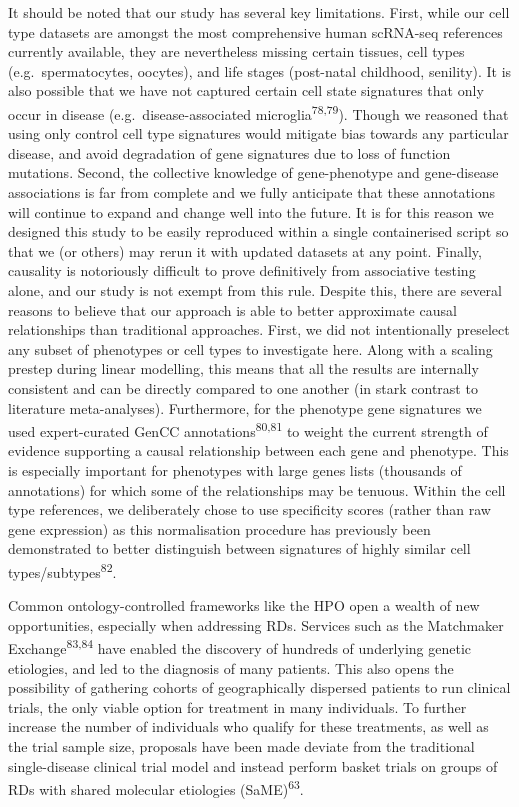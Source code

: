 \documentclass[
]{article}
\begin{document}
It should be noted that our study has several key limitations. First,
while our cell type datasets are amongst the most comprehensive human
scRNA-seq references currently available, they are nevertheless missing
certain tissues, cell types (e.g.~spermatocytes, oocytes), and life
stages (post-natal childhood, senility). It is also possible that we
have not captured certain cell state signatures that only occur in
disease (e.g.~disease-associated microglia\textsuperscript{78,79}).
Though we reasoned that using only control cell type signatures would
mitigate bias towards any particular disease, and avoid degradation of
gene signatures due to loss of function mutations. Second, the
collective knowledge of gene-phenotype and gene-disease associations is
far from complete and we fully anticipate that these annotations will
continue to expand and change well into the future. It is for this
reason we designed this study to be easily reproduced within a single
containerised script so that we (or others) may rerun it with updated
datasets at any point. Finally, causality is notoriously difficult to
prove definitively from associative testing alone, and our study is not
exempt from this rule. Despite this, there are several reasons to
believe that our approach is able to better approximate causal
relationships than traditional approaches. First, we did not
intentionally preselect any subset of phenotypes or cell types to
investigate here. Along with a scaling prestep during linear modelling,
this means that all the results are internally consistent and can be
directly compared to one another (in stark contrast to literature
meta-analyses). Furthermore, for the phenotype gene signatures we used
expert-curated GenCC annotations\textsuperscript{80,81} to weight the
current strength of evidence supporting a causal relationship between
each gene and phenotype. This is especially important for phenotypes
with large genes lists (thousands of annotations) for which some of the
relationships may be tenuous. Within the cell type references, we
deliberately chose to use specificity scores (rather than raw gene
expression) as this normalisation procedure has previously been
demonstrated to better distinguish between signatures of highly similar
cell types/subtypes\textsuperscript{82}.

Common ontology-controlled frameworks like the HPO open a wealth of new
opportunities, especially when addressing RDs. Services such as the
Matchmaker Exchange\textsuperscript{83,84} have enabled the discovery of
hundreds of underlying genetic etiologies, and led to the diagnosis of
many patients. This also opens the possibility of gathering cohorts of
geographically dispersed patients to run clinical trials, the only
viable option for treatment in many individuals. To further increase the
number of individuals who qualify for these treatments, as well as the
trial sample size, proposals have been made deviate from the traditional
single-disease clinical trial model and instead perform basket trials on
groups of RDs with shared molecular etiologies
(SaME)\textsuperscript{63}.
\end{document}

